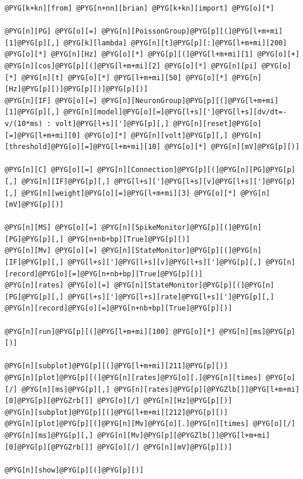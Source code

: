 \documentclass[letterpaper,10pt,english]{manual}
\begin{document}
\begin{Verbatim}[commandchars=@\[\]]
@PYG[k+kn][from] @PYG[n+nn][brian] @PYG[k+kn][import] @PYG[o][*]

@PYG[n][PG] @PYG[o][=] @PYG[n][PoissonGroup]@PYG[p][(]@PYG[l+m+mi][1]@PYG[p][,] @PYG[k][lambda] @PYG[n][t]@PYG[p][:]@PYG[l+m+mi][200] @PYG[o][*] @PYG[n][Hz] @PYG[o][*] @PYG[p][(]@PYG[l+m+mi][1] @PYG[o][+] @PYG[n][cos]@PYG[p][(]@PYG[l+m+mi][2] @PYG[o][*] @PYG[n][pi] @PYG[o][*] @PYG[n][t] @PYG[o][*] @PYG[l+m+mi][50] @PYG[o][*] @PYG[n][Hz]@PYG[p][)]@PYG[p][)]@PYG[p][)]
@PYG[n][IF] @PYG[o][=] @PYG[n][NeuronGroup]@PYG[p][(]@PYG[l+m+mi][1]@PYG[p][,] @PYG[n][model]@PYG[o][=]@PYG[l+s][']@PYG[l+s][dv/dt=-v/(10*ms) : volt]@PYG[l+s][']@PYG[p][,] @PYG[n][reset]@PYG[o][=]@PYG[l+m+mi][0] @PYG[o][*] @PYG[n][volt]@PYG[p][,] @PYG[n][threshold]@PYG[o][=]@PYG[l+m+mi][10] @PYG[o][*] @PYG[n][mV]@PYG[p][)]

@PYG[n][C] @PYG[o][=] @PYG[n][Connection]@PYG[p][(]@PYG[n][PG]@PYG[p][,] @PYG[n][IF]@PYG[p][,] @PYG[l+s][']@PYG[l+s][v]@PYG[l+s][']@PYG[p][,] @PYG[n][weight]@PYG[o][=]@PYG[l+m+mi][3] @PYG[o][*] @PYG[n][mV]@PYG[p][)]

@PYG[n][MS] @PYG[o][=] @PYG[n][SpikeMonitor]@PYG[p][(]@PYG[n][PG]@PYG[p][,] @PYG[n+nb+bp][True]@PYG[p][)]
@PYG[n][Mv] @PYG[o][=] @PYG[n][StateMonitor]@PYG[p][(]@PYG[n][IF]@PYG[p][,] @PYG[l+s][']@PYG[l+s][v]@PYG[l+s][']@PYG[p][,] @PYG[n][record]@PYG[o][=]@PYG[n+nb+bp][True]@PYG[p][)]
@PYG[n][rates] @PYG[o][=] @PYG[n][StateMonitor]@PYG[p][(]@PYG[n][PG]@PYG[p][,] @PYG[l+s][']@PYG[l+s][rate]@PYG[l+s][']@PYG[p][,] @PYG[n][record]@PYG[o][=]@PYG[n+nb+bp][True]@PYG[p][)]

@PYG[n][run]@PYG[p][(]@PYG[l+m+mi][100] @PYG[o][*] @PYG[n][ms]@PYG[p][)]

@PYG[n][subplot]@PYG[p][(]@PYG[l+m+mi][211]@PYG[p][)]
@PYG[n][plot]@PYG[p][(]@PYG[n][rates]@PYG[o][.]@PYG[n][times] @PYG[o][/] @PYG[n][ms]@PYG[p][,] @PYG[n][rates]@PYG[p][@PYGZlb[]]@PYG[l+m+mi][0]@PYG[p][@PYGZrb[]] @PYG[o][/] @PYG[n][Hz]@PYG[p][)]
@PYG[n][subplot]@PYG[p][(]@PYG[l+m+mi][212]@PYG[p][)]
@PYG[n][plot]@PYG[p][(]@PYG[n][Mv]@PYG[o][.]@PYG[n][times] @PYG[o][/] @PYG[n][ms]@PYG[p][,] @PYG[n][Mv]@PYG[p][@PYGZlb[]]@PYG[l+m+mi][0]@PYG[p][@PYGZrb[]] @PYG[o][/] @PYG[n][mV]@PYG[p][)]

@PYG[n][show]@PYG[p][(]@PYG[p][)]
\end{Verbatim}

\resetcurrentobjects
\hypertarget{--doc-examples-misc_pulsepacket}{}
\end{document}
